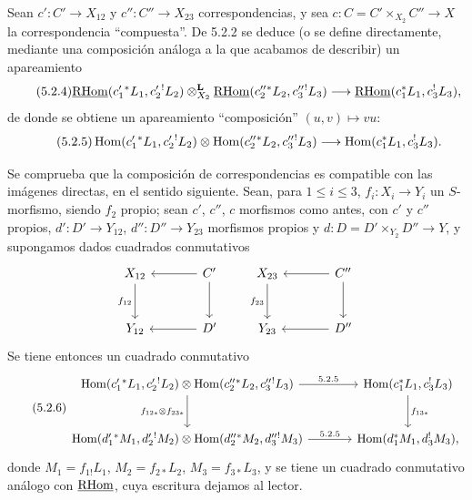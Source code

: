 Sean $c':C'\to X_{12}$ y $c'':C''\to X_{23}$ correspondencias, y sea $c:C=C'\times_{X_2}C''\to X$ la correspondencia ``compuesta''. De 5.2.2 se deduce (o se define directamente, mediante una composición análoga a la que acabamos de describir) un apareamiento
\begin{equation}
\tag{5.2.4}
\underline{\mathrm{RHom}}(c_1'{}^*L_1,c_2'{}^!L_2)\otimes_{X_2}^{\mathbf L}\underline{\mathrm{RHom}}(c_2''{}^*L_2,c_3''{}^!L_3)
\longrightarrow\underline{\mathrm{RHom}}(c_1^*L_1,c_3^!L_3),
\end{equation}
de donde se obtiene un apareamiento ``composición'' $(u,v)\mapsto vu$:
\begin{equation}
\tag{5.2.5}
\operatorname{Hom}(c_1'{}^*L_1,c_2'{}^!L_2)\otimes\operatorname{Hom}(c_2''{}^*L_2,c_3''{}^!L_3)
\longrightarrow\operatorname{Hom}(c_1^*L_1,c_3^!L_3).
\end{equation}

Se comprueba que la composición de correspondencias es compatible con las imágenes directas, en el sentido siguiente. Sean, para $1\leq i\leq 3$, $f_i:X_i\to Y_i$ un $S$-morfismo, siendo $f_2$ propio; sean $c'$, $c''$, $c$ morfismos como antes, con $c'$ y $c''$ propios, $d':D'\to Y_{12}$, $d'':D''\to Y_{23}$ morfismos propios y $d:D=D'\times_{Y_2}D''\to Y$, y supongamos dados cuadrados conmutativos
\[
\begin{tikzcd}[column sep=large,row sep=large]
X_{12} \arrow[d,"f_{12}"'] & C' \arrow[l] \arrow[d] \\
Y_{12} & D' \arrow[l]
\end{tikzcd}
\qquad
\begin{tikzcd}[column sep=large,row sep=large]
X_{23} \arrow[d,"f_{23}"'] & C'' \arrow[l] \arrow[d] \\
Y_{23} & D'' \arrow[l]
\end{tikzcd}
\]
Se tiene entonces un cuadrado conmutativo
\begin{equation}
\tag{5.2.6}
\begin{tikzcd}[column sep=large,row sep=large]
\Hom(c_1'{}^*L_1,c_2'{}^!L_2)\otimes\Hom(c_2''{}^*L_2,c_3''{}^!L_3) \arrow[r,"5.2.5"] \arrow[d,"f_{12*}\otimes f_{23*}"']
& \Hom(c_1^*L_1,c_3^!L_3) \arrow[d,"f_{13*}"] \\
\Hom(d_1'{}^*M_1,d_2'{}^!M_2)\otimes\Hom(d_2''{}^*M_2,d_3''{}^!M_3) \arrow[r,"5.2.5"]
& \Hom(d_1^*M_1,d_3^!M_3),
\end{tikzcd}
\end{equation}
donde $M_1=f_{1!}L_1$, $M_2=f_{2*}L_2$, $M_3=f_{3*}L_3$, y se tiene un cuadrado conmutativo análogo con $\underline{\mathrm{RHom}}$, cuya escritura dejamos al lector.


